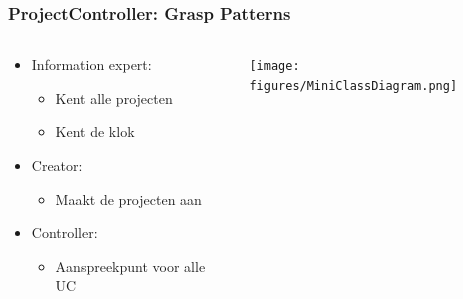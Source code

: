 \documentclass{beamer}
\begin{document}
%
%   
%

\begin{frame}
\frametitle {ProjectController: Grasp Patterns}
\begin{columns}
    \begin{column}{.45\paperwidth}
    \begin{itemize}
        \item Information expert:
            \begin{itemize}
                \item Kent alle projecten
                \item Kent de klok
            \end{itemize}
        \item Creator:
            \begin{itemize}
                \item Maakt de projecten aan
            \end{itemize}
        \item Controller:
            \begin{itemize}
                \item Aanspreekpunt voor alle UC
            \end{itemize}
    \end{itemize}
    \end{column}
    \begin{column}{.45\paperwidth}
        \texttt{[image: figures/MiniClassDiagram.png]}
    \end{column}
\end{columns}
\end{frame}

%
\end{document}
